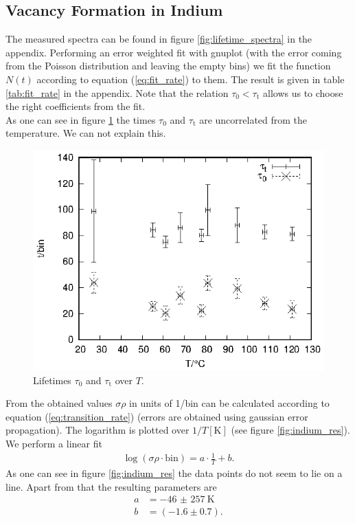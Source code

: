 \newpage

\subsection{Vacancy Formation in Indium}

The measured spectra can be found in figure \ref{fig:lifetime_spectra} in the appendix. Performing an error weighted fit with gnuplot (with the error coming from the Poisson distribution and leaving the empty bins) we fit the function $N(t)$ according to equation (\ref{eq:fit_rate}) to them. The result is given in table \ref{tab:fit_rate} in the appendix. Note that the relation $\tau_0 < \tau_\mathrm{t}$ allows us to choose the right coefficients from the fit. \\

As one can see in figure \ref{fig:indium_times} the times $\tau_0$ and $\tau_\mathrm{t}$ are uncorrelated from the temperature. We can not explain this. 

\begin{figure}[h]
\centering
\includegraphics[width=0.6\linewidth]{auswertung/times.eps}
\caption{Lifetimes $\tau_0$ and $\tau_\mathrm{t}$ over $T$.}
\label{fig:indium_times}
\end{figure}


From the obtained values $\sigma \rho$ in units of 1/bin can be calculated according to equation (\ref{eq:transition_rate}) (errors are obtained using gaussian error propagation). The logarithm is plotted over $1/T[\si{\kelvin}]$ (see figure \ref{fig:indium_res}). We perform a linear fit 
\begin{align*}
  \log(\sigma\rho\cdot \mathrm{bin})=a \cdot \frac{1}{T}+b.
\end{align*} 
As one can see in figure \ref{fig:indium_res} the data points do not seem to lie on a line. Apart from that the resulting parameters are
\begin{align*}
  a&=\SI[separate-uncertainty=true]{-46(257)}{\kelvin}\\
  b&=(-1.6 \pm 0.7).
\end{align*}


